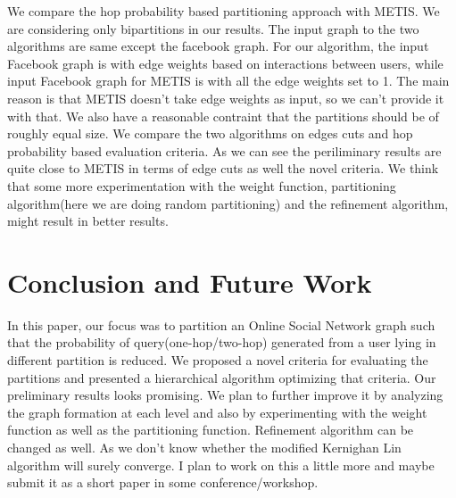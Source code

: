 \documentclass[letterpaper]{article}
\begin{document}
\begin{itemize}
\end{itemize}

We compare the hop probability based partitioning approach with METIS. We are
considering only bipartitions in our results. The input graph to the two
algorithms are same except the facebook graph. For our algorithm, the input
Facebook graph is with edge weights based on  interactions between users, while
input Facebook graph for METIS is with all the edge weights set to 1. The main
reason is that METIS doesn't take edge weights as input, so we can't provide it
with that. We also have a reasonable contraint that the partitions should be of
roughly equal size. We compare the two algorithms on edges cuts and hop
probability based evaluation criteria. As we can see the periliminary results
are quite close to METIS in terms of edge cuts as well the novel criteria. We
think that some more experimentation with the weight function, partitioning
algorithm(here we are doing random partitioning) and the refinement algorithm,
might result in better results. 
\section{Conclusion and Future Work}
In this paper, our focus was to partition an Online Social Network graph such
that the probability of query(one-hop/two-hop) generated from a user lying in
different partition is reduced. We proposed a novel criteria for evaluating the
partitions and presented a hierarchical algorithm optimizing that criteria. Our
preliminary results looks promising. We plan to further improve it by 
analyzing the graph formation at each level and also by experimenting with the
weight function as well as the partitioning function. Refinement algorithm can
be changed as well. As we don't know whether the modified Kernighan Lin
algorithm will surely converge. I plan to work on this a little more and maybe
submit it as a short paper in some conference/workshop.
 
\end{document}
